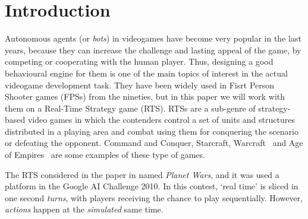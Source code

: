 \documentclass{llncs}
\begin{document}
%
%
\section{Introduction}
\label{sec:intro}
%

Autonomous agents (or \textit{bots}) in videogames have become very popular in the last years, because they can increase the challenge and lasting appeal of the game, by competing or cooperating with the human player.
Thus, designing a good behavioural engine for them is one of the main
topics of interest in the actual videogame development task.
They have been widely used in Fisrt Person Shooter games (FPSs) %
from the nineties, but in this paper we will %
work with them on a Real-Time Strategy game (RTS).
RTSs are a sub-genre of strategy-based video games in which the contenders control a set of units and structures distributed in a playing area and combat using them for conquering the scenario or defeating the opponent.
Command and Conquer\texttrademark,
Starcraft\texttrademark, Warcraft\texttrademark~ and Age of
Empires\texttrademark~ are some examples of these type of games.   

The RTS considered %
in the paper 
in named \textit{Planet Wars}, and it was used a platform in the Google AI Challenge 2010. %
In this contest, `real time' is sliced in one second \textit{turns}, with players receiving the chance to play sequentially. However, \textit{actions} happen at the \textit{simulated} same time. 
\end{document}
